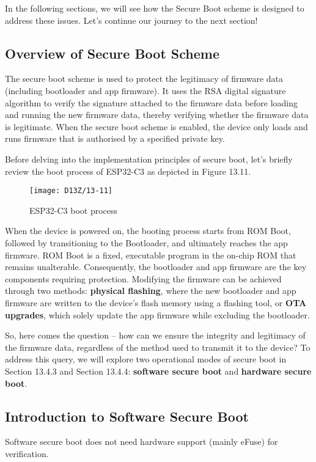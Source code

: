 \documentclass[a4paper,12pt]{book}
\begin{document}
In the following sections, we will see how the Secure Boot scheme is designed to address these issues. Let’s continue our journey to the next section!

\subsection{Overview of Secure Boot Scheme}
The secure boot scheme is used to protect the legitimacy of firmware data (including bootloader and app firmware). It uses the RSA digital signature algorithm to verify the signature attached to the firmware data before loading and running the new firmware data, thereby verifying whether the firmware data is legitimate. When the secure boot scheme is enabled, the device only loads and runs firmware that is authorised by a specified private key.

Before delving into the implementation principles of secure boot, let’s briefly review the boot process of ESP32-C3 as depicted in Figure 13.11.

\begin{figure}[!h]
    \centering
    \texttt{[image: D13Z/13-11]}
    \caption{ESP32-C3 boot process}
\end{figure}

When the device is powered on, the booting process starts from ROM Boot, followed by transitioning to the Bootloader, and ultimately reaches the app firmware. ROM Boot is a fixed, executable program in the on-chip ROM that remains unalterable. Consequently, the bootloader and app firmware are the key components requiring protection. Modifying the firmware can be achieved through two methods: \textbf{physical flashing}, where the new bootloader and app firmware are written to the device’s flash memory using a flashing tool, or \textbf{OTA upgrades}, which solely update the app firmware while excluding the bootloader.

So, here comes the question – how can we ensure the integrity and legitimacy of the firmware data, regardless of the method used to transmit it to the device? To address this query, we will explore two operational modes of secure boot in Section 13.4.3 and Section 13.4.4: \textbf{software secure boot} and \textbf{hardware secure boot}.


\subsection{Introduction to Software Secure Boot}
Software secure boot does not need hardware support (mainly eFuse) for verification.
\end{document}
